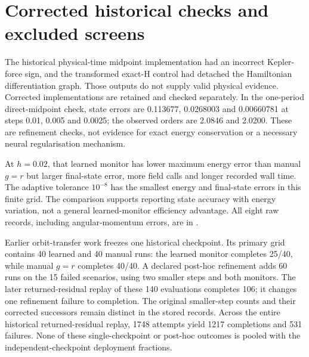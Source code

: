 \documentclass[11pt]{article}
\newcommand{\code}[1]{\texttt{\detokenize{#1}}}
\begin{document}
\section{Corrected historical checks and excluded screens}
\label{sec:historical-checks}

The historical physical-time midpoint implementation had an incorrect
Kepler-force sign, and the transformed exact-H control had detached the
Hamiltonian differentiation graph. Those outputs do not supply valid
physical evidence. Corrected implementations are retained and checked
separately. In the one-period direct-midpoint check, state errors are
0.113677, 0.0268003 and 0.00660781 at steps 0.01, 0.005 and 0.0025;
the observed orders are 2.0846 and 2.0200. These are refinement checks,
not evidence for exact energy conservation or a necessary neural
regularisation mechanism.

\begin{table}[ht]
\centering\small
\caption{All eight corrected historical Kepler configurations over
100 periods, generated from saved raw records. The frozen historical
learned monitor is a single checkpoint, distinct from the independent
deployment arms. Wall times belong to the original recorded CPU host;
field calls do not equate analytic and automatic-differentiation costs.}
\label{tab:historical-cost}

\end{table}

At $h=0.02$, that learned monitor has lower maximum energy error than
manual $g=r$ but larger final-state error, more field calls and longer
recorded wall time. The adaptive tolerance $10^{-8}$ has the smallest
energy and final-state errors in this finite grid. The comparison
supports reporting state accuracy with energy variation, not a general
learned-monitor efficiency advantage. All eight raw records, including
angular-momentum errors, are in
\code{results/expAC2/corrected_100period.json}.

Earlier orbit-transfer work freezes one historical checkpoint. Its
primary grid contains 40 learned and 40 manual runs: the learned monitor
completes 25/40, while manual $g=r$ completes 40/40. A declared post-hoc
refinement adds 60 runs on the 15 failed scenarios, using two smaller
steps and both monitors. The later returned-residual replay of these
140 evaluations completes 106; it changes one refinement failure to
completion. The original smaller-step counts and their corrected
successors remain distinct in the stored records. Across the entire
historical returned-residual replay, 1748 attempts yield 1217 completions
and 531 failures. None of these single-checkpoint or post-hoc outcomes
is pooled with the independent-checkpoint deployment fractions.
\end{document}
